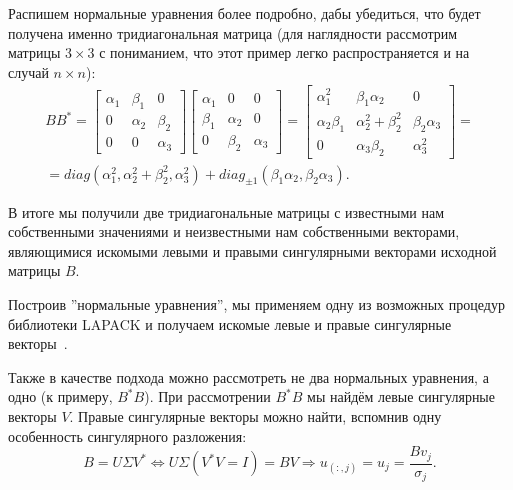 Распишем нормальные уравнения более подробно, дабы убедиться, что будет получена именно тридиагональная матрица (для наглядности рассмотрим матрицы $3\times 3$ с пониманием, что этот пример легко распространяется и на случай $n\times n$):
\begin{equation*}
    \begin{split}
        BB^*=\begin{bmatrix}
            \alpha_1 & \beta_1 & 0\\
            0 & \alpha_2 & \beta_2 \\
            0 & 0 & \alpha_3  
        \end{bmatrix}\begin{bmatrix}
            \alpha_1 & 0 & 0\\
            \beta_1 & \alpha_2 & 0 \\
            0 & \beta_2 & \alpha_3  
        \end{bmatrix} =
        \begin{bmatrix}
            \alpha_1^2 & \beta_1 \alpha_2 & 0 \\
            \alpha_2 \beta_1 & \alpha_2^2+\beta_2^2 & \beta_2 \alpha_3 \\
            0 & \alpha_3 \beta_2 & \alpha_3^2
        \end{bmatrix} =\\[6pt]= diag(\alpha_1^2, \alpha_2^2+\beta^2_2,\alpha_3^2)+diag_{\pm1}(\beta_1\alpha_2,\beta_2\alpha_3).
    \end{split}
\end{equation*}

В итоге мы получили две тридиагональные матрицы с известными нам собственными значениями и неизвестными нам собственными векторами, являющимися искомыми левыми и правыми сингулярными векторами исходной матрицы $B$.


Построив ''нормальные уравнения'', мы применяем одну из возможных процедур библиотеки LAPACK и получаем искомые левые и правые сингулярные векторы~\cite{mr3_algo4triagonal_sym_eigen_and_bidiagSVD}.

Также в качестве подхода можно рассмотреть не два нормальных уравнения, а одно (к примеру, $B^*B$). При рассмотрении $B^*B$ мы найдём левые сингулярные векторы $V$. Правые сингулярные векторы можно найти, вспомнив одну особенность сингулярного разложения:
\begin{equation*}
     B=U \Sigma V^* \Leftrightarrow U\Sigma(V^*V=I)=BV \Rightarrow u_{(:,j)}=u_j= \frac{Bv_j}{\sigma_j}.
\end{equation*}

